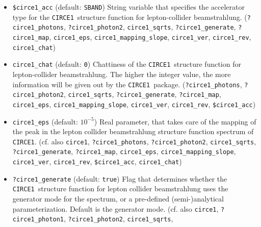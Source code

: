 \documentclass[12pt]{book}
\newcommand{\ttt}[1]{\texttt{#1}}
\newcommand{\circeone}{\texttt{CIRCE1}}
\begin{document}
\begin{itemize}
both beams simultaneously. (cf. also \ttt{beams}, \ttt{?circe1\_photons},
\ttt{?circe1\_photon2}, \ttt{circe1\_sqrts},  
\ttt{?circe1\_generate}, \ttt{?circe1\_map},
\ttt{circe1\_eps}, \newline \ttt{circe1\_mapping\_slope}, \ttt{circe1\_ver},
\ttt{circe1\_rev}, \ttt{\$circe1\_acc}, \ttt{circe1\_chat})
\item
\ttt{\$circe1\_acc} \qquad (default: \ttt{SBAND}) \newline
String variable that specifies the accelerator type for the \circeone\
structure function for lepton-collider beamstrahlung. 
(\ttt{?circe1\_photons}, \ttt{?circe1\_photon2}, \ttt{circe1\_sqrts},  
\ttt{?circe1\_generate}, \ttt{?circe1\_map},
\ttt{circe1\_eps}, \ttt{circe1\_mapping\_slope}, \ttt{circe1\_ver},
\newline \ttt{circe1\_rev}, \ttt{circe1\_chat})
\item
\ttt{circe1\_chat} \qquad (default: \ttt{0}) \newline
Chattiness of the \circeone\ structure function for lepton-collider
beamstrahlung. The higher the integer value, the more information will
be given out by the \circeone\ package. (\ttt{?circe1\_photons},
\ttt{?circe1\_photon2}, \ttt{circe1\_sqrts},   
\ttt{?circe1\_generate}, \ttt{?circe1\_map},
\ttt{circe1\_eps}, \ttt{circe1\_mapping\_slope}, \ttt{circe1\_ver},
\newline \ttt{circe1\_rev}, \ttt{\$circe1\_acc})
\item
\ttt{circe1\_eps} \qquad (default: $10^{-5}$) \newline
Real parameter, that takes care of the mapping of the peak in the
lepton collider beamstrahlung structure function spectrum of
\circeone.  (cf. also \ttt{circe1}, \ttt{?circe1\_photons},
\ttt{?circe1\_photon2}, \ttt{circe1\_sqrts},  
\ttt{?circe1\_generate}, \ttt{?circe1\_map},
\ttt{circe1\_eps}, \newline \ttt{circe1\_mapping\_slope}, \ttt{circe1\_ver},
\ttt{circe1\_rev}, \ttt{\$circe1\_acc}, \ttt{circe1\_chat})
\item
\ttt{?circe1\_generate} \qquad (default: \ttt{true}) \newline
Flag that determines whether the \circeone\ structure function for
lepton collider beamstrahlung uses the generator mode for the
spectrum, or a pre-defined (semi-)analytical parameterization. Default
is the generator mode. (cf. also \ttt{circe1}, \ttt{?circe1\_photon1},
\newline \ttt{?circe1\_photon2},  \ttt{circe1\_sqrts},

\end{itemize}
\end{document}
